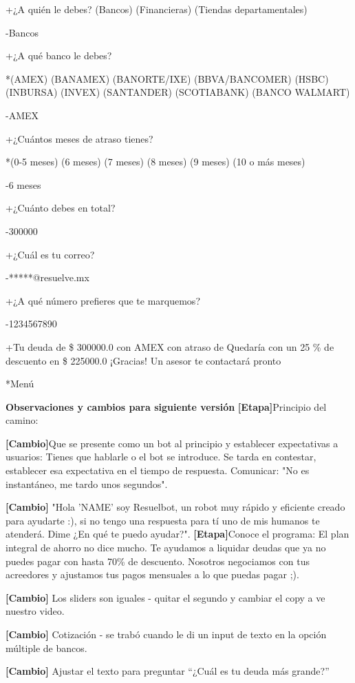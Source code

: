 +¿A quién le debes? (Bancos) (Financieras) (Tiendas departamentales)

-Bancos

+¿A qué banco le debes?

*(AMEX) (BANAMEX) (BANORTE/IXE) (BBVA/BANCOMER) (HSBC) (INBURSA) (INVEX) (SANTANDER) (SCOTIABANK) (BANCO WALMART)

-AMEX

+¿Cuántos meses de atraso tienes?

*(0-5 meses) (6 meses) (7 meses) (8 meses) (9 meses) (10 o más meses)

-6 meses

+¿Cuánto debes en total?

-300000

+¿Cuál es tu correo?

-*****@resuelve.mx

+¿A qué número prefieres que te marquemos?


-1234567890

+Tu deuda de \$ 300000.0 con AMEX con atraso de
Quedaría con un 25 \% de descuento en \$ 225000.0
¡Gracias! Un asesor te contactará pronto

*Menú

\smallskip
\textbf{Observaciones y cambios para siguiente versión}
\smallskip
\textbf{[Etapa]}Principio del camino:


 \textbf{[Cambio]}Que se presente como un bot al principio y establecer expectativas a usuarios: 
Tienes que hablarle o el bot se introduce. 
Se tarda en contestar, establecer esa expectativa en el tiempo de respuesta.  Comunicar: "No es instantáneo, me tardo unos segundos".

\textbf{[Cambio]}
"Hola 'NAME' soy Resuelbot, un robot muy rápido y eficiente creado para ayudarte :), si no tengo una respuesta para tí uno de mis humanos te atenderá. Dime ¿En qué te puedo ayudar?".
\textbf{[Etapa]}Conoce el programa: El plan integral de ahorro no dice mucho.
Te ayudamos a liquidar deudas que ya no puedes pagar con hasta 70\% de descuento. Nosotros negociamos con tus acreedores y ajustamos tus pagos mensuales a lo que puedas pagar ;). 

\textbf{[Cambio]} Los sliders son iguales - quitar el segundo y cambiar el copy a ve nuestro video.

\textbf{[Cambio]} Cotización - se trabó cuando le di un input de texto en la opción múltiple de bancos. 

\textbf{[Cambio]} Ajustar el texto para preguntar “¿Cuál es tu deuda más grande?”

